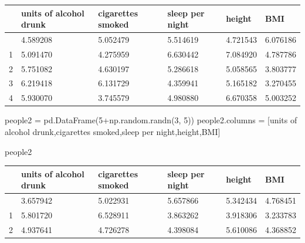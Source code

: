 \documentclass[
  letterpaper,
  DIV=11,
  numbers=noendperiod]{scrreprt}
\newenvironment{Shaded}{\begin{snugshade}}{\end{snugshade}}
\newcommand{\DecValTok}[1]{\textcolor[rgb]{0.68,0.00,0.00}{#1}}
\newcommand{\NormalTok}[1]{\textcolor[rgb]{0.00,0.23,0.31}{#1}}
\newcommand{\OperatorTok}[1]{\textcolor[rgb]{0.37,0.37,0.37}{#1}}
\newcommand{\StringTok}[1]{\textcolor[rgb]{0.13,0.47,0.30}{#1}}
\begin{document}
\begin{longtable}[]{@{}llllll@{}}
\toprule\noalign{}
& units of alcohol drunk & cigarettes smoked & sleep per night & height
& BMI \\
\midrule\noalign{}
\endhead
\bottomrule\noalign{}
\endlastfoot
0 & 4.589208 & 5.052479 & 5.514619 & 4.721543 & 6.076186 \\
1 & 5.091470 & 4.275959 & 6.630442 & 7.084920 & 4.787786 \\
2 & 5.751082 & 4.630197 & 5.286618 & 5.058565 & 3.803777 \\
3 & 6.219418 & 6.131729 & 4.359941 & 5.165182 & 3.270455 \\
4 & 5.930070 & 3.745579 & 4.980880 & 6.670358 & 5.003252 \\
\end{longtable}

\begin{Shaded}
\begin{Highlighting}[]
\NormalTok{people2 }\OperatorTok{=}\NormalTok{ pd.DataFrame(}\DecValTok{5}\OperatorTok{+}\NormalTok{np.random.randn(}\DecValTok{3}\NormalTok{, }\DecValTok{5}\NormalTok{))}
\NormalTok{people2.columns }\OperatorTok{=}\NormalTok{ [}\StringTok{\textquotesingle{}units of alcohol drunk\textquotesingle{}}\NormalTok{,}\StringTok{\textquotesingle{}cigarettes smoked\textquotesingle{}}\NormalTok{,}\StringTok{\textquotesingle{}sleep per night\textquotesingle{}}\NormalTok{,}\StringTok{\textquotesingle{}height\textquotesingle{}}\NormalTok{,}\StringTok{\textquotesingle{}BMI\textquotesingle{}}\NormalTok{]}
\end{Highlighting}
\end{Shaded}

\begin{Shaded}
\begin{Highlighting}[]
\NormalTok{people2}
\end{Highlighting}
\end{Shaded}

\begin{longtable}[]{@{}llllll@{}}
\toprule\noalign{}
& units of alcohol drunk & cigarettes smoked & sleep per night & height
& BMI \\
\midrule\noalign{}
\endhead
\bottomrule\noalign{}
\endlastfoot
0 & 3.657942 & 5.022931 & 5.657866 & 5.342434 & 4.768451 \\
1 & 5.801720 & 6.528911 & 3.863262 & 3.918306 & 3.233783 \\
2 & 4.937641 & 4.726278 & 4.398084 & 5.610086 & 4.368852 \\
\end{longtable}
\end{document}
